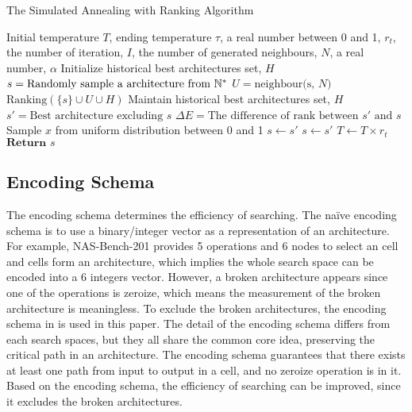 \documentclass[sigconf]{acmart}
\begin{document}
    \begin{algorithm}[h]
        \caption{The Simulated Annealing with Ranking Algorithm}\label{alg:SA}
        \begin{algorithmic}[1]
            \Parameter Initial temperature $T$, ending temperature $\tau$, a real number between 0 and 1, $r_t$, the number of iteration, $I$, the number of generated neighbours, $N$, a real number, $\alpha$
            \State Initialize historical best architectures set, $H$
            \State $s=\text{Randomly sample a architecture from }\Bbb N^*$
                    \State $U = \text{neighbour(s, }N\text{)}$
                    \State $\text{Ranking}(\{s\}\cup U\cup H)$
                    \State Maintain historical best architectures set, $H$
                    \State $s'=\text{Best architecture excluding }s$
                    \State $\Delta E=\text{The difference of rank between }s'\text{ and }s$
                    \State Sample $x$ from uniform distribution between 0 and 1
                        \State $s\leftarrow s'$
                    \Else
                            \State $s\leftarrow s'$
                        \EndIf
                    \EndIf
                \EndFor
                \State $T\leftarrow T\times r_t$
            \EndWhile
            \State $\textbf{Return }s$ 
        \end{algorithmic}
    \end{algorithm}

    \subsection{Encoding Schema}

    The encoding schema determines the efficiency of searching. The naïve encoding 
    schema is to use a binary/integer vector as a representation of an architecture. 
    For example, NAS-Bench-201 provides 5 operations and 6 nodes to select an cell 
    and cells form an architecture, which implies the whole search space can be 
    encoded into a 6 integers vector. However, a broken architecture appears since 
    one of the operations is zeroize, which means the measurement of the broken 
    architecture is meaningless. To exclude the broken architectures, the encoding 
    schema in \cite{10092788} is used in this paper. The detail of the encoding 
    schema differs from each search spaces, but they all share the common core idea, 
    preserving the critical path in an architecture. The encoding schema guarantees 
    that there exists at least one path from input to output in a cell, and no 
    zeroize operation is in it. Based on the encoding schema, the efficiency of 
    searching can be improved, since it excludes the broken architectures. 
\end{document}
